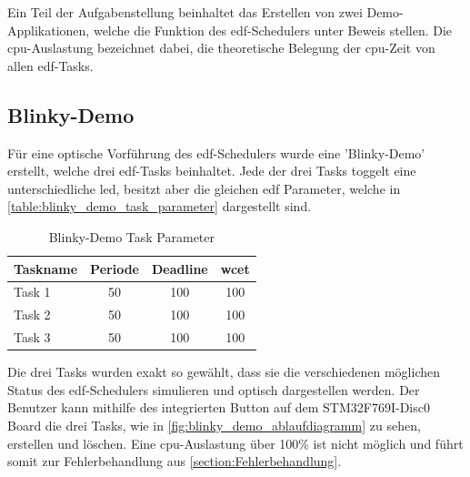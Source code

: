 \documentclass[../EDF Master Thesis.tex]{subfiles}
\begin{document}
    Ein Teil der Aufgabenstellung beinhaltet das Erstellen von zwei Demo-Applikationen, welche die Funktion des \ac{edf}-Schedulers unter Beweis stellen.
    Die \ac{cpu}-Auslastung bezeichnet dabei, die theoretische Belegung der \ac{cpu}-Zeit von allen \ac{edf}-Tasks.

    \subsection{Blinky-Demo} \label{section:blinky_demo}
    Für eine optische Vorführung des \ac{edf}-Schedulers wurde eine 'Blinky-Demo' erstellt, welche drei \ac{edf}-Tasks beinhaltet.
    Jede der drei Tasks toggelt eine unterschiedliche \ac{led}, besitzt aber die gleichen \ac{edf} Parameter, welche in \autoref{table:blinky_demo_task_parameter} dargestellt sind.

    \begin{table}[ht!]
        \centering
        \begin{tabular}{l|c|c|c}
            Taskname & Periode & Deadline & \ac{wcet} \\
            \hline
            Task 1 & 50 & 100 & 100\\
            Task 2 & 50 & 100 & 100\\
            Task 3 & 50 & 100 & 100\\
        \end{tabular}
        \caption{Blinky-Demo Task Parameter}
        \label{table:blinky_demo_task_parameter}
    \end{table}

    Die drei Tasks wurden exakt so gewählt, dass sie die verschiedenen möglichen Status des \ac{edf}-Schedulers simulieren und optisch dargestellen werden.
    Der Benutzer kann mithilfe des integrierten Button auf dem STM32F769I-Disc0 Board die drei Tasks, wie in \autoref{fig:blinky_demo_ablaufdiagramm} zu sehen, erstellen und löschen.
    Eine \ac{cpu}-Auslastung über 100\% ist nicht möglich und führt somit zur Fehlerbehandlung aus \autoref{section:Fehlerbehandlung}.
    
\end{document}

